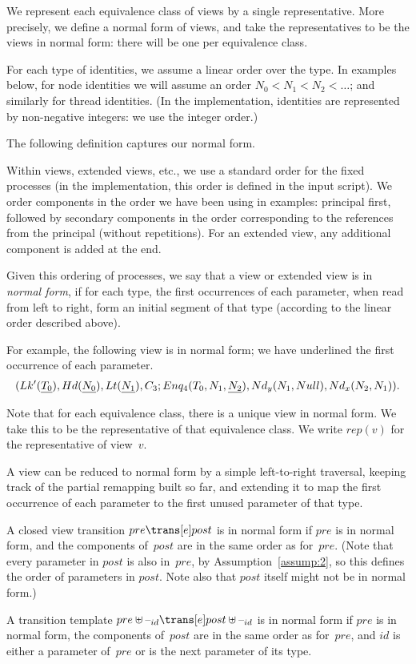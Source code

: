 We represent each equivalence class of views by a single representative.  More
precisely, we define a normal form of views, and take the representatives to
be the views in normal form: there will be one per equivalence class. 

For each type of identities, we assume a linear order over the type.  In
examples below, for node identities we will assume an order $N_0 < N_1 <
N_2 < \ldots$; and similarly for thread identities.  (In the implementation,
identities are represented by non-negative integers: we use the integer
order.)

The following definition captures our normal form.
%
\begin{definition}
Within views, extended views, etc., we use a standard order for the fixed
processes (in the implementation, this order is defined in the input script).
We order components in the order we have been using in examples: principal
first, followed by secondary components in the order corresponding to the
references from the principal (without repetitions).  For an extended view,
any additional component is added at the end.

Given this ordering of processes, we say that a view or extended view is in
\emph{normal form}, if for each type, the first occurrences of each parameter,
when read from left to right, form an initial segment of that type (according
to the linear order described above).   
\end{definition}

For example, the following view is in normal form; we have underlined the
first occurrence of each parameter.
\[
\begin{align}
(Lk'(\underline{T_0}), Hd(\underline{N_0}), 
    Lt(\underline{N_1}), C_3; 
  Enq_4(T_0, N_1, \underline{N_2}), Nd_y(N_1, Null),Nd_x(N_2, N_1)) .
\end{align}
\]

Note that for each equivalence class, there is a unique view in normal form.
We take this to be the representative of that equivalence class.  We write
$rep(v)$ for the representative of view~$v$. 

A view can be reduced to normal form by a simple left-to-right traversal,
keeping track of the partial remapping built so far, and extending it to map
the first occurrence of each parameter to the first unused parameter of that
type.


\begin{definition}
A closed view transition $pre \trans[e] post$ is in normal form if $pre$ is in
normal form, and the components of~$post$ are in the same order as for~$pre$.
(Note that every parameter in $post$ is also in~$pre$, by
Assumption~\ref{assump:2}, so this defines the order of parameters in $post$.
Note also that $post$ itself might not be in normal form.)

A transition template $pre \uplus \hole{id} \trans[e] post \uplus \hole{id}$
is in normal form if $pre$ is in normal form, the components of~$post$ are in
the same order as for~$pre$, and $id$ is either a parameter of~$pre$ or is the
next parameter of its type.
\end{definition}

